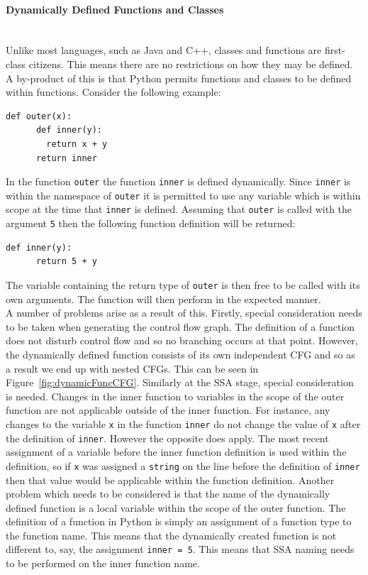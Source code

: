 \documentclass[12pt, titlepage]{article}
\begin{document}
\paragraph*{Dynamically Defined Functions and Classes} \mbox{} \\
Unlike most languages, such as Java and C++, classes and functions are first-class citizens. This means there are no restrictions on how they may be defined. A by-product of this is that Python permits functions and classes to be defined within functions. Consider the following example:
\begin{lstlisting}[mathescape]
    def outer(x):
      def inner(y):
        return x + y
      return inner
\end{lstlisting}
In the function \texttt{outer} the function \texttt{inner} is defined dynamically. Since \texttt{inner} is within the namespace of \texttt{outer} it is permitted to use any variable which is within scope at the time that \texttt{inner} is defined. Assuming that \texttt{outer} is called with the argument \texttt{5} then the following function definition will be returned:
\begin{lstlisting}[mathescape]
    def inner(y):
      return 5 + y
\end{lstlisting}
The variable containing the return type of \texttt{outer} is then free to be called with its own arguments. The function will then perform in the expected manner. \\
\indent A number of problems arise as a result of this. Firstly, special consideration needs to be taken when generating the control flow graph. The definition of a function does not disturb control flow and so no branching occurs at that point. However, the dynamically defined function consists of its own independent CFG and so as a result we end up with nested CFGs. This can be seen in Figure~\ref{fig:dynamicFuncCFG}. Similarly at the SSA stage, special consideration is needed. Changes in the inner function to variables in the scope of the outer function are not applicable outside of the inner function. For instance, any changes to the variable \texttt{x} in the function \texttt{inner} do not change the value of \texttt{x} after the definition of \texttt{inner}. However the opposite does apply. The most recent assignment of a variable before the inner function definition is used within the definition, so if \texttt{x} was assigned a \texttt{string} on the line before the definition of \texttt{inner} then that value would be applicable within the function definition. Another problem which needs to be considered is that the name of the dynamically defined function is a local variable within the scope of the outer function. The definition of a function in Python is simply an assignment of a function type to the function name. This means that the dynamically created function is not different to, say, the assignment \texttt{inner = 5}. This means that SSA naming needs to be performed on the inner function name. \\
\end{document}
